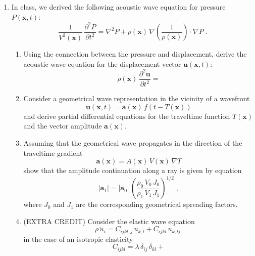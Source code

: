 \begin{enumerate}
\item In class, we derived the following acoustic wave equation for
  pressure $P(\mathbf{x},t)$:
\begin{equation}
{\frac{1}{V^2(\mathbf{x})}}\,{\frac{\partial^2 P}{\partial t^2}} =\nabla^2 P + 
\rho(\mathbf{x})\,
\nabla\left(\frac{1}{\rho(\mathbf{x})}\right) \cdot \nabla P\;.
\label{eq:pwave}
\end{equation}
\begin{enumerate}
\item Using the connection between the pressure and displacement, derive the
acoustic wave equation for the displacement vector
$\mathbf{u}(\mathbf{x},t)$:
\begin{equation}
  \label{eq:uwave}
  \rho(\mathbf{x})\,\frac{\partial^2 \mathbf{u}}{\partial t^2} =
\end{equation}
\item Consider a geometrical wave representation in the vicinity of a wavefront
\begin{equation}
  {\mathbf{u}(\mathbf{x},t)} = \mathbf{a}(\mathbf{x})\,f\left(t-T(\mathbf{x})\right)
  \label{eq:gwave}
\end{equation}
and derive partial differential equations for the traveltime function
$T(\mathbf{x})$ and the vector amplitude $\mathbf{a}(\mathbf{x})$.
\item Assuming that the geometrical wave propagates in the direction
  of the traveltime gradient
\begin{equation}
  {\mathbf{a}(\mathbf{x})} = A(\mathbf{x})\,V(\mathbf{x})\,\nabla T
  \label{eq:vamp}
\end{equation}
show that the amplitude continuation along a ray is given by equation 
\begin{equation}
  \label{eq:avj}
  \left|\mathbf{a}_1\right| = \left|\mathbf{a}_0\right|\,
  \left(\frac{\rho_0\,V_0\,J_0}{\rho_1\,V_1\,J_1}\right)^{1/2}\;, 
\end{equation}
where $J_0$ and $J_1$ are the corresponding geometrical spreading factors.
\item (EXTRA CREDIT) Consider the elastic wave equation
\begin{equation}
  \label{eq:ewave}
  \rho\,\ddot{u}_i = C_{ijkl,j}\,u_{k,l} + C_{ijkl}\,u_{k,lj}\;
\end{equation}
in the case of an isotropic elasticity
\begin{equation}
  \label{eq:lame}
  C_{ijkl} = \lambda\,\delta_{ij}\,\delta_{kl} + 

\end{equation}
\end{enumerate}
\end{enumerate}
